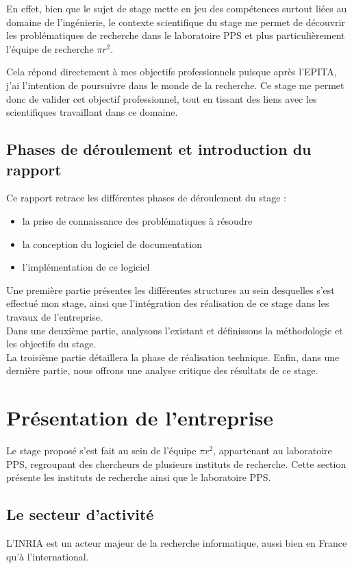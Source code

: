 \documentclass[a4paper, 11pt]{report}
\newcommand{\pir}[0]{\textbf{$\pi r^2$}\xspace}
\newcommand{\epita}[0]{EPITA}
\begin{document}
  En effet, bien que le sujet de stage mette en jeu des compétences surtout
  liées au domaine de l'ingénierie, le contexte scientifique du stage me
  permet de découvrir les problématiques de recherche dans le laboratoire PPS
  et plus particulièrement l'équipe de recherche \pir.

  Cela répond directement à mes objectifs professionnels puisque après l'\epita,
  j'ai l'intention de poursuivre dans le monde de la recherche. Ce stage me
  permet donc de valider cet objectif professionnel, tout en tissant des liens
  avec les scientifiques travaillant dans ce domaine.

  \section{Phases de déroulement et introduction du rapport}
  Ce rapport retrace les différentes phases de déroulement du stage :
  \begin{itemize}
    \item la prise de connaissance des problématiques à résoudre
    \item la conception du logiciel de documentation
    \item l'implémentation de ce logiciel
  \end{itemize}

  Une première partie présentes les différentes structures au sein desquelles
  s'est effectué mon stage, ainsi que l'intégration des réalisation de ce stage
  dans les travaux de l'entreprise. \\
  Dans une deuxième partie, analysons l'existant et définissons la méthodologie
  et les objectifs du stage. \\
  La troisième partie détaillera la phase de réalisation technique.
  Enfin, dans une dernière partie, nous offrons une analyse critique des
  résultats de ce stage.

\chapter{Présentation de l'entreprise}
  Le stage proposé s'est fait au sein de l'équipe \pir, appartenant au
  laboratoire PPS, regroupant des chercheurs de plusieurs instituts de
  recherche. Cette section présente les instituts de recherche ainsi que le
  laboratoire PPS.
  \section{Le secteur d'activité}
  L'INRIA est un acteur majeur de la recherche informatique, aussi bien en
  France qu'à l'international.
\end{document}
